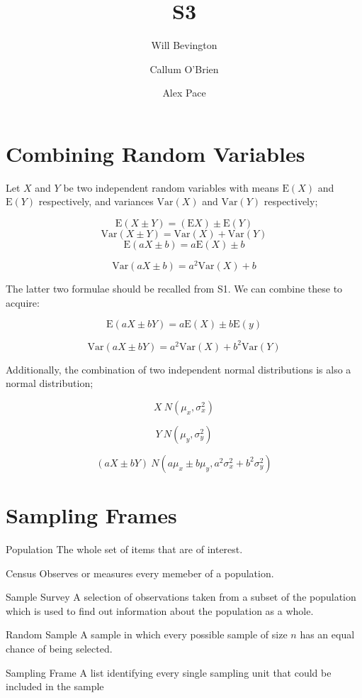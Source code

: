 \documentclass{article}
\begin{document}
\title{S3}
\author{Will Bevington \and Callum O'Brien \and Alex Pace}
\maketitle

\tableofcontents

\newpage

\section{Combining Random Variables}

Let $X$ and $Y$ be two independent random variables with means $\textrm{E}(X)$
and $\textrm{E}(Y)$ respectively, and variances $\textrm{Var}(X)$ and
$\textrm{Var}(Y)$ respectively;

\[\textrm{E}(X\pm Y)=(\textrm{E}X)\pm\textrm{E}(Y)\] \[\textrm{Var}(X\pm
Y)=\textrm{Var}(X)+\textrm{Var}(Y)\] \[\textrm{E}(aX\pm b)=a\textrm{E}(X)\pm b\]

\[\textrm{Var}(aX\pm b)=a^2\textrm{Var}(X)+b\]

\noindent The latter two formulae should be recalled from S1. We can combine
these to acquire:

\[\textrm{E}(aX\pm bY) = a\textrm{E}(X)\pm b\textrm{E}(y)\] 

\[\textrm{Var}(aX\pm
bY) = a^2\textrm{Var}(X)+b^2\textrm{Var}(Y)\]

\noindent Additionally, the combination of two independent normal distributions
is also a normal distribution;

\[X~N(\mu_x,\sigma_x^2)\] 

\[Y~N(\mu_y,\sigma_y^2)\] 

\[(aX\pm bY)~N(a\mu_x\pm
b\mu_y,a^2\sigma_x^2+b^2\sigma_y^2)\]

\section{Sampling Frames}

\begin{description}
    
    \item{Population} The whole set of items that are of interest.
    \item{Census} Observes or measures every memeber of a population.
    \item{Sample Survey} A selection of observations taken from a subset of the
        population which is used to find out information about the population as
        a whole.
    \item{Random Sample} A sample in which every possible sample of size $n$ has
        an equal chance of being selected.  
    \item{Sampling Frame} A list identifying every single sampling unit that
        could be included in the sample

\end{description}
\end{document}

